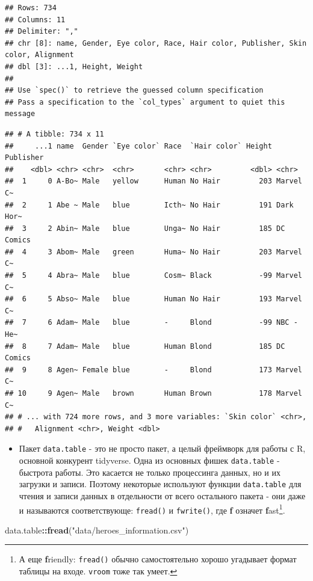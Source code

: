 \documentclass[]{book}
\newenvironment{Shaded}{\begin{snugshade}}{\end{snugshade}}
\newcommand{\KeywordTok}[1]{\textcolor[rgb]{0.13,0.29,0.53}{\textbf{#1}}}
\newcommand{\StringTok}[1]{\textcolor[rgb]{0.31,0.60,0.02}{#1}}
\newcommand{\OperatorTok}[1]{\textcolor[rgb]{0.81,0.36,0.00}{\textbf{#1}}}
\newcommand{\NormalTok}[1]{#1}
\providecommand{\tightlist}{%
  \setlength{\itemsep}{0pt}\setlength{\parskip}{0pt}}
\begin{document}
\begin{verbatim}
## Rows: 734
## Columns: 11
## Delimiter: ","
## chr [8]: name, Gender, Eye color, Race, Hair color, Publisher, Skin color, Alignment
## dbl [3]: ...1, Height, Weight
## 
## Use `spec()` to retrieve the guessed column specification
## Pass a specification to the `col_types` argument to quiet this message
\end{verbatim}

\begin{verbatim}
## # A tibble: 734 x 11
##     ...1 name  Gender `Eye color` Race  `Hair color` Height Publisher
##    <dbl> <chr> <chr>  <chr>       <chr> <chr>         <dbl> <chr>    
##  1     0 A-Bo~ Male   yellow      Human No Hair         203 Marvel C~
##  2     1 Abe ~ Male   blue        Icth~ No Hair         191 Dark Hor~
##  3     2 Abin~ Male   blue        Unga~ No Hair         185 DC Comics
##  4     3 Abom~ Male   green       Huma~ No Hair         203 Marvel C~
##  5     4 Abra~ Male   blue        Cosm~ Black           -99 Marvel C~
##  6     5 Abso~ Male   blue        Human No Hair         193 Marvel C~
##  7     6 Adam~ Male   blue        -     Blond           -99 NBC - He~
##  8     7 Adam~ Male   blue        Human Blond           185 DC Comics
##  9     8 Agen~ Female blue        -     Blond           173 Marvel C~
## 10     9 Agen~ Male   brown       Human Brown           178 Marvel C~
## # ... with 724 more rows, and 3 more variables: `Skin color` <chr>,
## #   Alignment <chr>, Weight <dbl>
\end{verbatim}

\begin{itemize}
\tightlist
\item
  Пакет \texttt{data.table} - это не просто пакет, а целый фреймворк для
  работы с R, основной конкурент tidyverse. Одна из основных фишек
  \texttt{data.table} - быстрота работы. Это касается не только
  процессинга данных, но и их загрузки и записи. Поэтому некоторые
  используют функции \texttt{data.table} для чтения и записи данных в
  отдельности от всего остального пакета - они даже и называются
  соответствующе: \texttt{fread()} и \texttt{fwrite()}, где \textbf{f}
  означет \textbf{f}ast\footnote{А еще \textbf{f}riendly:
    \texttt{fread()} обычно самостоятельно хорошо угадывает формат
    таблицы на входе. \texttt{vroom} тоже так умеет.}.
\end{itemize}

\begin{Shaded}
\begin{Highlighting}[]
\NormalTok{data.table}\OperatorTok{::}\KeywordTok{fread}\NormalTok{(}\StringTok{"data/heroes_information.csv"}\NormalTok{)}
\end{Highlighting}
\end{Shaded}
\end{document}
